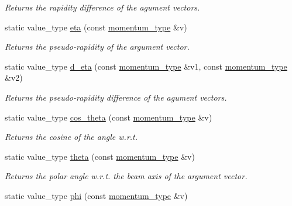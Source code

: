 \begin{DoxyCompactItemize}
\begin{DoxyCompactList}\small\item\em Returns the rapidity difference of the agument vectors. \end{DoxyCompactList}\item 
\hypertarget{a00451_a2f10f0a4b3bb48a2fba7203ac0d53894}{}static value\+\_\+type \hyperlink{a00451_a2f10f0a4b3bb48a2fba7203ac0d53894}{eta} (const \hyperlink{a00579}{momentum\+\_\+type} \&v)\label{a00451_a2f10f0a4b3bb48a2fba7203ac0d53894}

\begin{DoxyCompactList}\small\item\em Returns the pseudo-\/rapidity of the argument vector. \end{DoxyCompactList}\item 
\hypertarget{a00451_a4754a4456aa938db797b4684a87f7a4a}{}static value\+\_\+type \hyperlink{a00451_a4754a4456aa938db797b4684a87f7a4a}{d\+\_\+eta} (const \hyperlink{a00579}{momentum\+\_\+type} \&v1, const \hyperlink{a00579}{momentum\+\_\+type} \&v2)\label{a00451_a4754a4456aa938db797b4684a87f7a4a}

\begin{DoxyCompactList}\small\item\em Returns the pseudo-\/rapidity difference of the agument vectors. \end{DoxyCompactList}\item 
static value\+\_\+type \hyperlink{a00451_a23ce70822ce213db410bb117575f9ede}{cos\+\_\+theta} (const \hyperlink{a00579}{momentum\+\_\+type} \&v)
\begin{DoxyCompactList}\small\item\em Returns the cosine of the angle w.\+r.\+t. \end{DoxyCompactList}\item 
\hypertarget{a00451_ae305e6b42040803777223eed938d1992}{}static value\+\_\+type \hyperlink{a00451_ae305e6b42040803777223eed938d1992}{theta} (const \hyperlink{a00579}{momentum\+\_\+type} \&v)\label{a00451_ae305e6b42040803777223eed938d1992}

\begin{DoxyCompactList}\small\item\em Returns the polar angle w.\+r.\+t. the beam axis of the argument vector. \end{DoxyCompactList}\item 
\hypertarget{a00451_a02e898a57394c50775153d6e55a7d842}{}static value\+\_\+type \hyperlink{a00451_a02e898a57394c50775153d6e55a7d842}{phi} (const \hyperlink{a00579}{momentum\+\_\+type} \&v)\label{a00451_a02e898a57394c50775153d6e55a7d842}


\end{DoxyCompactItemize}
